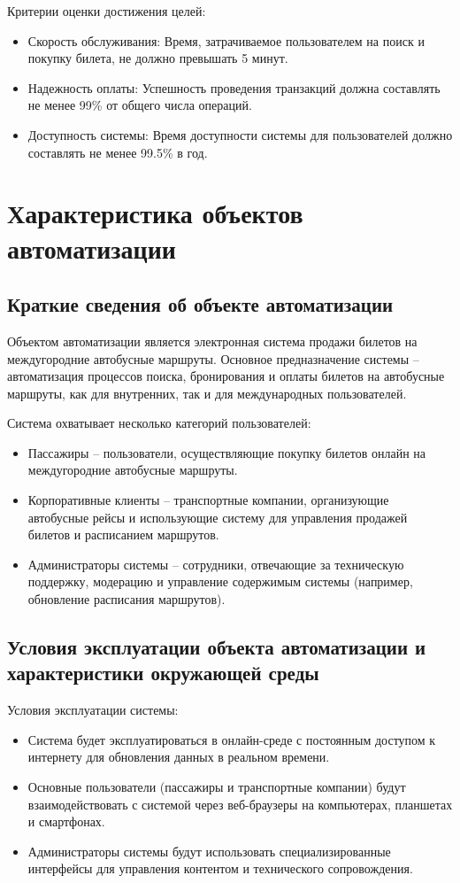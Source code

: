 \noindent Критерии оценки достижения целей:
\begin{itemize}
    \item Скорость обслуживания: Время, затрачиваемое пользователем на поиск и
    покупку билета, не должно превышать 5 минут.
    \item Надежность оплаты: Успешность проведения транзакций должна составлять
    не менее 99\% от общего числа операций.
    \item Доступность системы: Время доступности системы для пользователей
    должно составлять не менее 99.5\% в год.
\end{itemize}

\section{Характеристика объектов автоматизации}

\subsection{Краткие сведения об объекте автоматизации}
Объектом автоматизации является электронная система продажи билетов на
междугородние автобусные маршруты. Основное предназначение системы --
автоматизация процессов поиска, бронирования и оплаты билетов на автобусные
маршруты, как для внутренних, так и для международных пользователей.

Система охватывает несколько категорий пользователей:
\begin{itemize}
    \item Пассажиры -- пользователи, осуществляющие покупку билетов онлайн на
    междугородние автобусные маршруты.
    \item Корпоративные клиенты -- транспортные компании, организующие
    автобусные рейсы и использующие систему для управления продажей билетов и
    расписанием маршрутов.
    \item Администраторы системы -- сотрудники, отвечающие за техническую
    поддержку, модерацию и управление содержимым системы (например, обновление
    расписания маршрутов).
\end{itemize}

\subsection{Условия эксплуатации объекта автоматизации и характеристики окружающей среды}

\noindent Условия эксплуатации системы:
\begin{itemize}
    \item Система будет эксплуатироваться в онлайн-среде с постоянным доступом к
    интернету для обновления данных в реальном времени.
    \item Основные пользователи (пассажиры и транспортные компании) будут
    взаимодействовать с системой через веб-браузеры на компьютерах, планшетах и
    смартфонах.
    \item Администраторы системы будут использовать специализированные
    интерфейсы для управления контентом и технического сопровождения.
\end{itemize}

